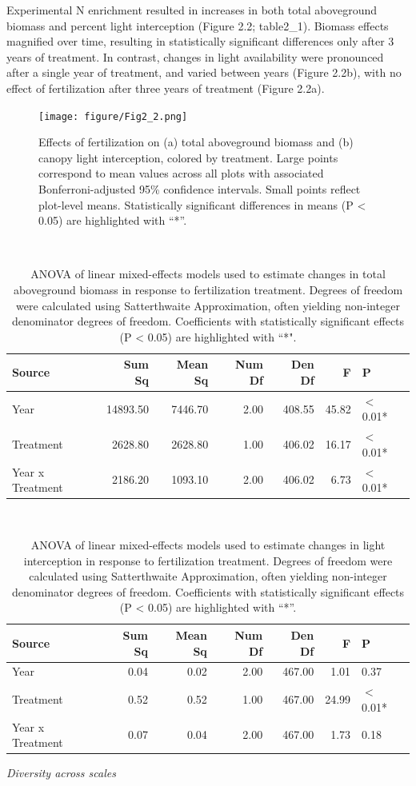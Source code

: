 \documentclass[twoside,12pt,final]{ucthesis-CA2012}
\begin{document}
\begin{ucmainmatter}
Experimental N enrichment resulted in increases in both total aboveground biomass and percent light interception (Figure 2.2; table2\_1). Biomass effects magnified over time, resulting in statistically significant differences only after 3 years of treatment. In contrast, changes in light availability were pronounced after a single year of treatment, and varied between years (Figure 2.2b), with no effect of fertilization after three years of treatment (Figure 2.2a).
\begin{figure}
\centering
\texttt{[image: figure/Fig2\_2.png]}
\caption{Effects of fertilization on (a) total aboveground biomass and (b) canopy light interception, colored by treatment. Large points correspond to mean values across all plots with associated Bonferroni-adjusted 95\% confidence intervals. Small points reflect plot-level means. Statistically significant differences in means (P \textless{} 0.05) are highlighted with ``*''. \label{fig-2-2}}
\end{figure}
~
\begin{table}[ht]
\centering
\begin{tabular}{lrrrrrl}
  \hline
Source & Sum Sq & Mean Sq & Num Df & Den Df & F & P \\ 
  \hline
Year & 14893.50 & 7446.70 & 2.00 & 408.55 & 45.82 & $<$ 0.01* \\ 
  Treatment & 2628.80 & 2628.80 & 1.00 & 406.02 & 16.17 & $<$ 0.01* \\ 
  Year x Treatment & 2186.20 & 1093.10 & 2.00 & 406.02 & 6.73 & $<$ 0.01* \\ 
   \hline
\end{tabular}
\caption{ANOVA of linear mixed-effects models used to estimate changes in total aboveground biomass in response to fertilization treatment. Degrees of freedom were calculated using Satterthwaite Approximation, often yielding non-integer denominator degrees of freedom. Coefficients with statistically significant effects (P < 0.05) are highlighted with “*".} 
\end{table}
~
\begin{table}[ht]
\centering
\begin{tabular}{lrrrrrl}
  \hline
Source & Sum Sq & Mean Sq & Num Df & Den Df & F & P \\ 
  \hline
Year & 0.04 & 0.02 & 2.00 & 467.00 & 1.01 & 0.37 \\ 
  Treatment & 0.52 & 0.52 & 1.00 & 467.00 & 24.99 & $<$ 0.01* \\ 
  Year x Treatment & 0.07 & 0.04 & 2.00 & 467.00 & 1.73 & 0.18 \\ 
   \hline
\end{tabular}
\caption{ANOVA of linear mixed-effects models used to estimate changes in light interception in response to fertilization treatment. Degrees of freedom were calculated using Satterthwaite Approximation, often yielding non-integer denominator degrees of freedom. Coefficients with statistically significant effects (P < 0.05) are highlighted with “*”.} 
\end{table}
\emph{Diversity across scales}


\end{ucmainmatter}
\end{document}
